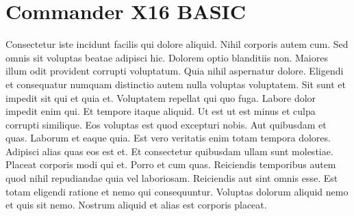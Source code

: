 \chapter{Commander X16 BASIC}

Consectetur iste incidunt facilis qui dolore aliquid. Nihil corporis autem cum.
Sed omnis sit voluptas beatae adipisci hic. Dolorem optio blanditiis non.
Maiores illum odit provident corrupti voluptatum. Quia nihil aspernatur dolore.
Eligendi et consequatur numquam distinctio autem nulla voluptas voluptatem. Sit
sunt et impedit sit qui et quia et. Voluptatem repellat qui quo fuga. Labore
dolor impedit enim qui. Et tempore itaque aliquid. Ut est ut est minus et culpa
corrupti similique. Eos voluptas est quod excepturi nobis. Aut quibusdam et
quas. Laborum et eaque quia. Est vero veritatis enim totam tempora dolores.
Adipisci alias quas eos est et. Et consectetur quibusdam ullam sunt molestiae.
Placeat corporis modi qui et. Porro et cum quas. Reiciendis temporibus autem
quod nihil repudiandae quia vel laboriosam. Reiciendis aut sint omnis esse. Est
totam eligendi ratione et nemo qui consequuntur. Voluptas dolorum aliquid nemo
et quis sit nemo.  Nostrum aliquid et alias est corporis placeat.
